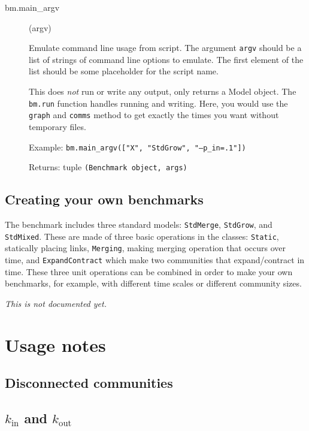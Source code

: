 \documentclass{article}
\def\kin{k_\mathrm{in}}
\def\kout{k_\mathrm{out}}
\def\code#1{\texttt{#1}}
\begin{document}
\begin{description}
\item[bm.main\_argv]\hspace{-.15cm}(argv)

  Emulate command line usage from script.  The argument \texttt{argv}
  should be a list of strings of command line options to emulate.  The
  first element of the list should be some placeholder for the script name.

  This does \textsl{not} run or write any output, only returns a Model
  object.  The \code{bm.run} function handles running and writing.
  Here, you would use the \code{graph} and \code{comms} method to get
  exactly the times you want without temporary files.

  Example: \code{bm.main\_argv(["X", "StdGrow", "--p\_in=.1"])}

  Returns: tuple \texttt{(Benchmark \textrm{object}, args)}

\end{description}




\subsection{Creating your own benchmarks}
\label{sec:use-newtests}

The benchmark includes three standard models: \texttt{StdMerge},
\texttt{StdGrow}, and \texttt{StdMixed}.  These are made of three
basic operations in the classes: \texttt{Static}, statically placing links,
\texttt{Merging}, making merging operation that occurs over time, and
\texttt{ExpandContract} which make two communities that expand/contract
in time.  These three unit operations can be combined in order to make
your own benchmarks, for example, with different time scales or
different community sizes.

\textsl{This is not documented yet.}




\section{Usage notes}
\label{sec:usage-notes}

\subsection{Disconnected communities}

\subsection{$\kin$ and $\kout$}
\end{document}
